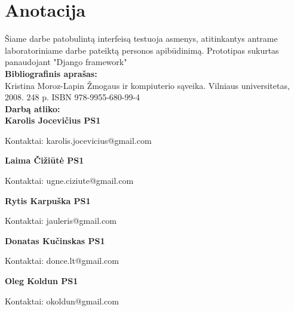 

\newcommand{\anotacijaIndelis}[3]{
	\textbf{#1}
	\begin{flushleft}
	\hspace*{1cm}
	Kontaktai: #2
	\\
	\hspace*{1cm}
	Indėlis: #3
	\end{flushleft}
}

\newcommand{\anotacija}[2]{
	\textbf{#1}
	\begin{flushleft}
	\hspace*{1cm}
	Kontaktai: #2
	\end{flushleft}
}

\section*{Anotacija}

		Šiame darbe patobulintą interfeisą testuoja asmenys, atitinkantys antrame laboratoriniame darbe pateiktą personos apibūdinimą. 
		Prototipas sukurtas panaudojant "Django framework" \\
		
		\textbf{Bibliografinis aprašas:}\\
		Kristina Moroz-Lapin Žmogaus ir kompiuterio sąveika. Vilniaus universitetas, 2008. 248 p. ISBN 978-9955-680-99-4
		\\
		
		\textbf{Darbą atliko:}\\

		\anotacija{Karolis Jocevičius PS1}{karolis.jocevicius@gmail.com}
		
		\anotacija{Laima Čižiūtė PS1}{ugne.ciziute@gmail.com}
		
		\anotacija{Rytis Karpuška PS1}{jauleris@gmail.com}

		\anotacija{Donatas Kučinskas PS1}{donce.lt@gmail.com}

		\anotacija{Oleg Koldun PS1}{okoldun@gmail.com}
